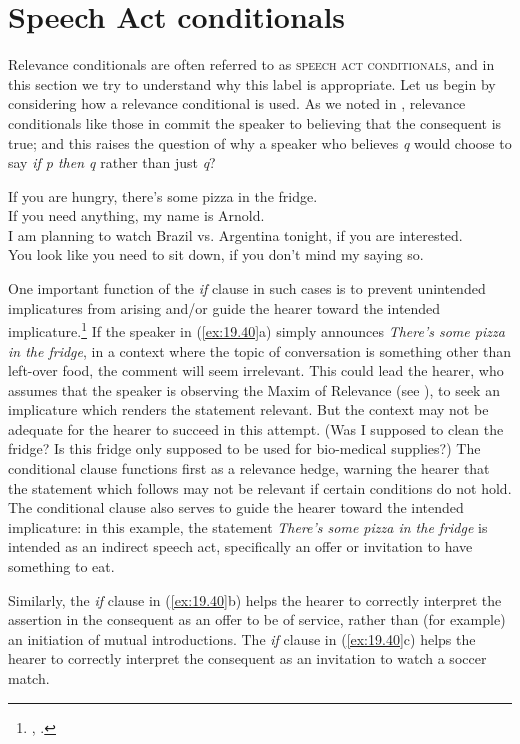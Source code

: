 \section{Speech Act conditionals}\label{sec:19.7}

Relevance conditionals are often referred to as \textsc{speech act conditionals}, and in this section we try to understand why this label is appropriate. Let us begin by considering how a relevance conditional is used. As we noted in , relevance conditionals like those in  commit the speaker to believing that the consequent is true; and this raises the question of why a speaker who believes \textit{q} would choose to say \textit{if p then q} rather than just \textit{q}?


\ea \label{ex:19.40}
\ea  If you are hungry, there’s some pizza in the fridge.\\
\ex If you need anything, my name is Arnold.\\
\ex I am planning to watch Brazil vs. Argentina tonight, if you are interested.\\
\ex You look like you need to sit down, if you don’t mind my saying so.
                       \z
\z


One important function of the \textit{if} clause in such cases is to prevent unintended implicatures from arising and/or guide the hearer toward the intended implicature.\footnote{\citet{DeRoseGrandy1999}, \citet{Franke2008}.} If the speaker in (\ref{ex:19.40}a) simply announces \textit{There’s some pizza in the fridge}, in a context where the topic of conversation is something other than left-over food, the comment will seem irrelevant. This could lead the hearer, who assumes that the speaker is observing the Maxim of Relevance (see ), to seek an implicature which renders the statement relevant. But the context may not be adequate for the hearer to succeed in this attempt. (Was I supposed to clean the fridge? Is this fridge only supposed to be used for bio-medical supplies?) The conditional clause functions first as a relevance hedge, warning the hearer that the statement which follows may not be relevant if certain conditions do not hold. The conditional clause also serves to guide the hearer toward the intended implicature: in this example, the statement \textit{There’s some pizza in the fridge} is intended as an indirect speech act, specifically an offer or invitation to have something to eat.



Similarly, the \textit{if} clause in (\ref{ex:19.40}b) helps the hearer to correctly interpret the assertion in the consequent as an offer to be of service, rather than (for example) an initiation of mutual introductions. The \textit{if} clause in (\ref{ex:19.40}c) helps the hearer to correctly interpret the consequent as an invitation to watch a soccer match.




